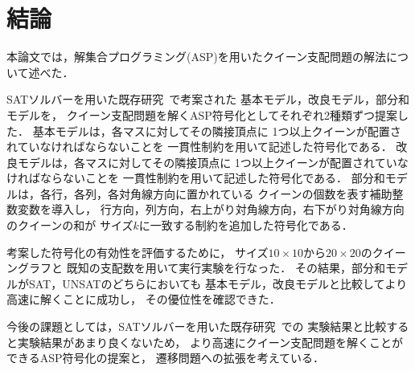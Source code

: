 \chapter{結論}\label{chap:conclusion}

本論文では，解集合プログラミング(ASP)を用いたクイーン支配問題の解法について述べた．

SATソルバーを用いた既存研究~\cite{yamamoto21}で考案された
基本モデル，改良モデル，部分和モデルを，
クイーン支配問題を解くASP符号化としてそれぞれ2種類ずつ提案した．
基本モデルは，各マスに対してその隣接頂点に
1つ以上クイーンが配置されていなければならないことを
一貫性制約を用いて記述した符号化である．
改良モデルは，各マスに対してその隣接頂点に
1つ以上クイーンが配置されていなければならないことを
一貫性制約を用いて記述した符号化である．
部分和モデルは，各行，各列，各対角線方向に置かれている
クイーンの個数を表す補助整数変数を導入し，
行方向，列方向，右上がり対角線方向，右下がり対角線方向のクイーンの和が
サイズ$k$に一致する制約を追加した符号化である．

考案した符号化の有効性を評価するために，
サイズ$10 \times 10$から$20 \times 20$のクイーングラフと
既知の支配数を用いて実行実験を行なった．
その結果，部分和モデルがSAT，UNSATのどちらにおいても
基本モデル，改良モデルと比較してより高速に解くことに成功し，
その優位性を確認できた．

今後の課題としては，SATソルバーを用いた既存研究~\cite{yamamoto21}での
実験結果と比較すると実験結果があまり良くないため，
より高速にクイーン支配問題を解くことができるASP符号化の提案と，
遷移問題への拡張を考えている．

